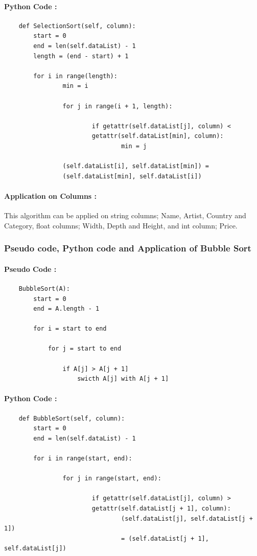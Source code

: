 \documentclass[12pt]{article}
\begin{document}
    \paragraph{Python Code :}
    \begin{verbatim}
    def SelectionSort(self, column):
        start = 0
        end = len(self.dataList) - 1
        length = (end - start) + 1
        
        for i in range(length):
                min = i
                
                for j in range(i + 1, length):
                
                        if getattr(self.dataList[j], column) <
                        getattr(self.dataList[min], column):
                                min = j
                                
                (self.dataList[i], self.dataList[min]) =
                (self.dataList[min], self.dataList[i])
    \end{verbatim}
    \paragraph{Application on Columns :} 
    This algorithm can be applied on string columns; Name, Artist, Country and Category, float columns; Width, Depth and Height, and int column; Price.
    
    \newpage
    \subsubsection{Pseudo code, Python code and Application of Bubble Sort}
    \paragraph{Pseudo Code :}
    \begin{verbatim}
    BubbleSort(A):
        start = 0
        end = A.length - 1
        
        for i = start to end
                    
            for j = start to end
                    
                if A[j] > A[j + 1]
                    swicth A[j] with A[j + 1]
    \end{verbatim}
    \paragraph{Python Code :}
    \begin{verbatim}
    def BubbleSort(self, column):
        start = 0
        end = len(self.dataList) - 1
    
        for i in range(start, end):
                
                for j in range(start, end):
                
                        if getattr(self.dataList[j], column) >
                        getattr(self.dataList[j + 1], column):
                                (self.dataList[j], self.dataList[j + 1])
                                = (self.dataList[j + 1], self.dataList[j])
    \end{verbatim}
\end{document}
